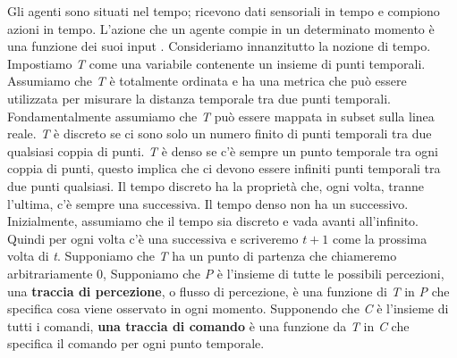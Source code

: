 \documentclass[a4paper]{extarticle}
\begin{document}
Gli agenti sono situati nel tempo; ricevono dati sensoriali in tempo e compiono azioni in tempo. L'azione che un agente compie in un determinato momento è una funzione dei suoi input . Consideriamo innanzitutto la nozione di tempo. Impostiamo \textit{T} come una variabile contenente un insieme di punti temporali. Assumiamo che \textit{T} è totalmente ordinata e ha una metrica che può essere utilizzata per misurare la distanza temporale tra due punti temporali. Fondamentalmente assumiamo che \textit{T} può essere mappata in subset sulla linea reale. \textit{T} è discreto se ci sono solo un numero finito di punti temporali tra due qualsiasi coppia di punti. \textit{T} è denso se c'è sempre un punto temporale tra ogni coppia di punti, questo implica che ci devono essere infiniti punti temporali tra due punti qualsiasi. Il tempo discreto ha la proprietà che, ogni volta, tranne l'ultima, c'è sempre una successiva. Il tempo denso non ha un successivo. Inizialmente, assumiamo che il tempo sia discreto e vada avanti all'infinito. Quindi per ogni volta c'è una successiva e scriveremo \textit{$t+1$} come la prossima volta di \textit{t}. Supponiamo che \textit{T} ha un punto di partenza che chiameremo arbitrariamente 0, Supponiamo che \textit{P} è l'insieme di tutte le possibili percezioni, una \textbf{traccia di percezione}, o flusso di percezione, è una funzione di \textit{T} in \textit{P} che specifica cosa viene osservato in ogni momento. Supponendo che \textit{C} è l'insieme di tutti i comandi, \textbf{una traccia di comando} è una funzione da \textit{T} in \textit{C} che specifica il comando per ogni punto temporale.
\end{document}
